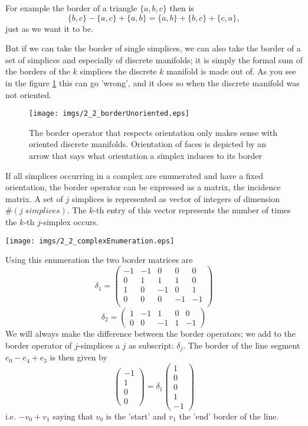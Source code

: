 For example the border of a triangle $\{a,b,c\}$ then is \[\{b,c\} -\{a,c\} + \{a,b\} = \{a,b\} + \{b,c\} + \{c,a\},\] just as we want it to be.

But if we can take the border of single simplices, we can also take the border of a set of simplices and especially of discrete manifolds; it is simply the formal sum of the borders of the $k$ simplices the discrete $k$ manifold is made out of. As you see in the figure \ref{fig::2_2_borderUnoriented} this can go 'wrong', and it does so when the discrete manifold was not oriented. 

\begin{figure}
\begin{center}
\texttt{[image: imgs/2\_2\_borderUnoriented.eps]}
\end{center}
\label{fig::2_2_borderUnoriented}
\caption{The border operator that respects orientation only makes sense with oriented discrete manifolds. Orientation of faces is depicted by an arrow that says what orientation a simplex induces to its border}
\end{figure}

If all simplices occurring in a complex are enumerated and have a fixed orientation, the border operator can be expressed as a matrix, the incidence matrix. A set of $j$ simplices is represented as vector of integers of dimension $\#(j\;simplices)$. The $k$-th entry of this vector represents the number of times the $k$-th $j$-simplex occurs.
\begin{center}
\texttt{[image: imgs/2\_2\_complexEnumeration.eps]}
\end{center}
Using this enumeration the two border matrices are
\[\delta_1 = \begin{pmatrix}
-1&-1&0 &0 & 0\\
0&1&1 &1 & 0\\
1&0&-1 &0&1\\
0&0&0&-1&-1\\
\end{pmatrix} \]
\[\delta_2 = \begin{pmatrix}
1 & -1 & 1 &0&0\\
0& 0& -1 & 1 & -1
\end{pmatrix}\]
We will always make the difference between the border operators; we add to the border operator of $j$-simplices a $j$ as subscript: $\delta_j$. The border of the line segment $e_0 -e_4 + e_3$ is then given by
\[\begin{pmatrix}
-1\\ 1\\ 0 \\0 
\end{pmatrix} = \delta_1\begin{pmatrix}
1\\0\\ 0\\1\\-1
\end{pmatrix}\]
i.e. $-v_0 + v_1$ saying that $v_0$ is the 'start' and $v_1$ the 'end' border of the line. 

